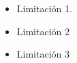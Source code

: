 
\lipsum[3]

\begin{itemize}
  \item Limitación 1.
  \item Limitación 2
  \item Limitación 3
\end{itemize}
